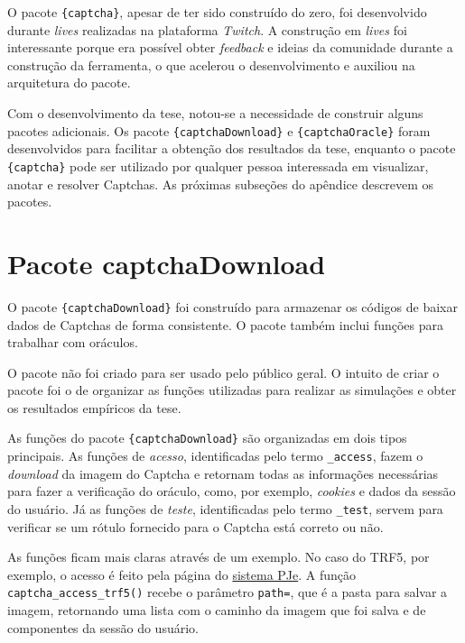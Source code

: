 \documentclass[12pt,twoside,brazilian]{book}
\begin{document}
O pacote \texttt{\{captcha\}}, apesar de ter sido construído do zero,
foi desenvolvido durante \emph{lives} realizadas na plataforma
\emph{Twitch}. A construção em \emph{lives} foi interessante porque era
possível obter \emph{feedback} e ideias da comunidade durante a
construção da ferramenta, o que acelerou o desenvolvimento e auxiliou na
arquitetura do pacote.

Com o desenvolvimento da tese, notou-se a necessidade de construir
alguns pacotes adicionais. Os pacote \texttt{\{captchaDownload\}} e
\texttt{\{captchaOracle\}} foram desenvolvidos para facilitar a obtenção
dos resultados da tese, enquanto o pacote \texttt{\{captcha\}} pode ser
utilizado por qualquer pessoa interessada em visualizar, anotar e
resolver Captchas. As próximas subseções do apêndice descrevem os
pacotes.

\hypertarget{sec-pacote-download}{%
\section{Pacote captchaDownload}\label{sec-pacote-download}}

O pacote \texttt{\{captchaDownload\}} foi construído para armazenar os
códigos de baixar dados de Captchas de forma consistente. O pacote
também inclui funções para trabalhar com oráculos.

O pacote não foi criado para ser usado pelo público geral. O intuito de
criar o pacote foi o de organizar as funções utilizadas para realizar as
simulações e obter os resultados empíricos da tese.

As funções do pacote \texttt{\{captchaDownload\}} são organizadas em
dois tipos principais. As funções de \emph{acesso}, identificadas pelo
termo \texttt{\_access}, fazem o \emph{download} da imagem do Captcha e
retornam todas as informações necessárias para fazer a verificação do
oráculo, como, por exemplo, \emph{cookies} e dados da sessão do usuário.
Já as funções de \emph{teste}, identificadas pelo termo \texttt{\_test},
servem para verificar se um rótulo fornecido para o Captcha está correto
ou não.

As funções ficam mais claras através de um exemplo. No caso do TRF5, por
exemplo, o acesso é feito pela página do
\href{https://pje.trf5.jus.br/pjeconsulta/ConsultaPublica/listView.seam}{sistema
PJe}. A função \texttt{captcha\_access\_trf5()} recebe o parâmetro
\texttt{path=}, que é a pasta para salvar a imagem, retornando uma lista
com o caminho da imagem que foi salva e de componentes da sessão do
usuário.
\end{document}
